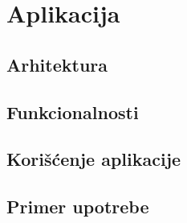 \chapter{Aplikacija}

\section{Arhitektura}

\section{Funkcionalnosti}

\section{Korišćenje aplikacije}

\section{Primer upotrebe}
